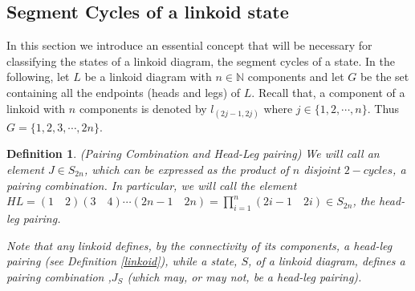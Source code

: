 \documentclass{article}
\newtheorem{definition}{Definition}[section]
\begin{document}
\subsection{Segment Cycles of a linkoid state}\label{Comb}

In this section we introduce an essential concept that will be necessary for classifying the states of a linkoid diagram, the segment cycles of a state. In the following, let $L$ be a linkoid diagram with $n \in \mathbb{N}$ components and let $G$ be the set containing all the endpoints (heads and legs) of $L$. Recall that, 
a component of a linkoid with $n$ components is denoted 
by $l_{(2j-1,2j)}$ where $j \in \{ 1, 2, \cdots, n\}$. Thus $G=\{ 1, 2, 3, \cdots , 2n\}$.


\begin{definition}(Pairing Combination and Head-Leg pairing) We will call an element $J \in S_{2n}$, which can be expressed as the product of $n$ disjoint $2-cycles$, a pairing combination. In particular, we will call the element $HL = (1\quad 2)(3\quad 4) \cdots (2n-1\quad 2n) = \prod_{i=1}^n (2i-1\quad 2i)\in S_{2n}$, the head-leg pairing. 

Note that any linkoid defines, by the connectivity of its components, a head-leg pairing (see Definition \ref{linkoid}), while a state, $S$, of a linkoid diagram, defines a pairing combination ,$J_S$ (which may, or may not, be a head-leg pairing). 



 


\end{definition}
\end{document}
